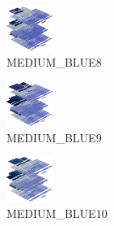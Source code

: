 \hspace{0.1cm}
\begin{minipage}[b]{0.15\linewidth}
\begin{figure}[H]                                                          
  \centering                                                             
  \begin{adjustbox}{width=1.5cm,center}                                   
  \includegraphics[width=1.5cm]{src/colorspace_colourflow/flows/colourflow_136-45.png}%
  \end{adjustbox}                                                        
\caption*{MEDIUM\_BLUE8}                                           
\end{figure}                                                               
\end{minipage}
\hspace{0.1cm}
\begin{minipage}[b]{0.15\linewidth}
\begin{figure}[H]                                                          
  \centering                                                             
  \begin{adjustbox}{width=1.5cm,center}                                   
  \includegraphics[width=1.5cm]{src/colorspace_colourflow/flows/colourflow_137-45.png}%
  \end{adjustbox}                                                        
\caption*{MEDIUM\_BLUE9}                                           
\end{figure}                                                               
\end{minipage}
\hspace{0.1cm}
\begin{minipage}[b]{0.15\linewidth}
\begin{figure}[H]                                                          
  \centering                                                             
  \begin{adjustbox}{width=1.5cm,center}                                   
  \includegraphics[width=1.5cm]{src/colorspace_colourflow/flows/colourflow_138-45.png}%
  \end{adjustbox}                                                        
\caption*{MEDIUM\_BLUE10}                                           
\end{figure}                                                               
\end{minipage}
